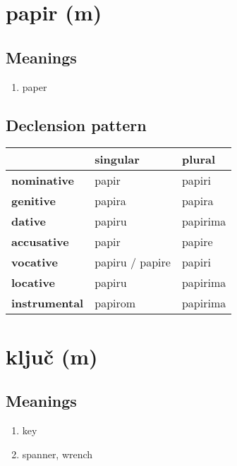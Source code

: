 \filbreak
\section{papir (m)}
\subsection*{Meanings}
\begin{enumerate}
\item paper
\end{enumerate}
\subsection*{Declension pattern}
\begin{tabularx}{\linewidth}{Xll}
\toprule
{} &         singular &    plural \\
\midrule
\textbf{nominative  } &            papir &    papiri \\
\textbf{genitive    } &           papira &    papira \\
\textbf{dative      } &           papiru &  papirima \\
\textbf{accusative  } &            papir &    papire \\
\textbf{vocative    } &  papiru / papire &    papiri \\
\textbf{locative    } &           papiru &  papirima \\
\textbf{instrumental} &          papirom &  papirima \\
\bottomrule
\end{tabularx}

\filbreak
\section{ključ (m)}
\subsection*{Meanings}
\begin{enumerate}
\item key
\item spanner, wrench
\end{enumerate}
